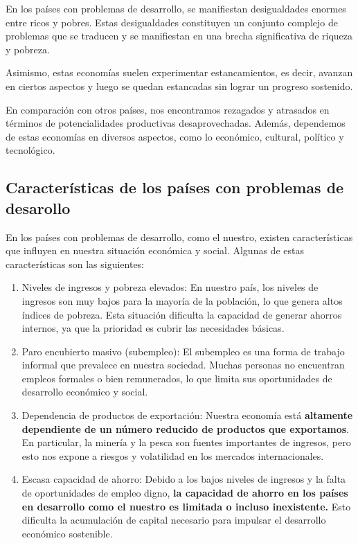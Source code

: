 \documentclass[
  jou,
  floatsintext,
  longtable,
  a4paper,
  nolmodern,
  notxfonts,
  notimes,
  12pt,
  colorlinks=true,linkcolor=blue,citecolor=blue,urlcolor=blue]{apa7}
\begin{document}
En los países con problemas de desarrollo, se manifiestan desigualdades
enormes entre ricos y pobres. Estas desigualdades constituyen un
conjunto complejo de problemas que se traducen y se manifiestan en una
brecha significativa de riqueza y pobreza.

Asimismo, estas economías suelen experimentar estancamientos, es decir,
avanzan en ciertos aspectos y luego se quedan estancadas sin lograr un
progreso sostenido.

En comparación con otros países, nos encontramos rezagados y atrasados
en términos de potencialidades productivas desaprovechadas. Además,
dependemos de estas economías en diversos aspectos, como lo económico,
cultural, político y tecnológico.

\subsection{Características de los países con problemas de
desarollo}\label{caracteruxedsticas-de-los-pauxedses-con-problemas-de-desarollo}

En los países con problemas de desarrollo, como el nuestro, existen
características que influyen en nuestra situación económica y social.
Algunas de estas características son las siguientes:

\begin{enumerate}
\def\labelenumi{\arabic{enumi}.}
\item
  Niveles de ingresos y pobreza elevados: En nuestro país, los niveles
  de ingresos son muy bajos para la mayoría de la población, lo que
  genera altos índices de pobreza. Esta situación dificulta la capacidad
  de generar ahorros internos, ya que la prioridad es cubrir las
  necesidades básicas.
\item
  Paro encubierto masivo (subempleo): El subempleo es una forma de
  trabajo informal que prevalece en nuestra sociedad. Muchas personas no
  encuentran empleos formales o bien remunerados, lo que limita sus
  oportunidades de desarrollo económico y social.
\item
  Dependencia de productos de exportación: Nuestra economía está
  \textbf{altamente dependiente de un número reducido de productos que
  exportamos}. En particular, la minería y la pesca son fuentes
  importantes de ingresos, pero esto nos expone a riesgos y volatilidad
  en los mercados internacionales.
\item
  Escasa capacidad de ahorro: Debido a los bajos niveles de ingresos y
  la falta de oportunidades de empleo digno, \textbf{la capacidad de
  ahorro en los países en desarrollo como el nuestro es limitada o
  incluso inexistente.} Esto dificulta la acumulación de capital
  necesario para impulsar el desarrollo económico sostenible.
\end{enumerate}
\end{document}
